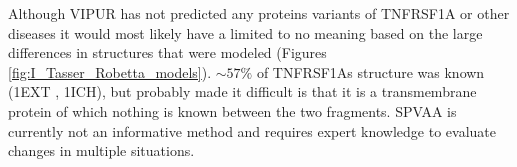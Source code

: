 %
%
 
Although VIPUR has not predicted any proteins variants of TNFRSF1A or other diseases it would most likely have a limited to no meaning based on the large differences in structures that were modeled (Figures \ref{fig:I_Tasser_Robetta_models}). $\sim57\%$ of TNFRSF1As structure was known (1EXT\cite{} , 1ICH\cite{}), but probably made it difficult is that it is a transmembrane protein of which nothing is known between the two fragments.
SPVAA is currently not an informative method and requires expert knowledge to evaluate changes in multiple situations.


%
